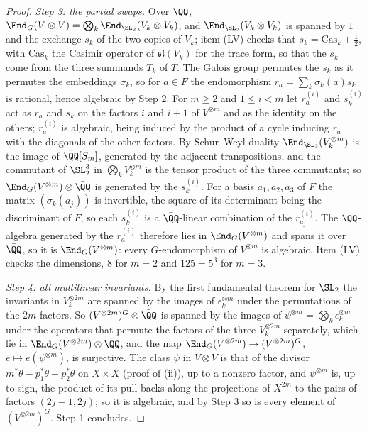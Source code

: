 \begin{proof}
\emph{Step 3: the partial swaps.} Over $\bar{\QQ}$,
$\End_{G}(V\otimes V)=\bigotimes_{k}\End_{\SL_{2}}(V_{k}\otimes V_{k})$, and
$\End_{\SL_{2}}(V_{k}\otimes V_{k})$ is spanned by $1$ and the exchange $s_{k}$
of the two copies of $V_{k}$; item (LV) checks that
$s_{k}=\mathrm{Cas}_{k}+\frac12$, with $\mathrm{Cas}_{k}$ the Casimir operator
of $\mathfrak{sl}(V_{k})$ for the trace form, so that the $s_{k}$ come from
the three summands $T_{k}$ of $T$. The Galois group permutes the $s_{k}$ as it
permutes the embeddings $\sigma_{k}$, so for $a\in F$ the endomorphism
$r_{a}=\sum_{k}\sigma_{k}(a)s_{k}$ is rational, hence algebraic by Step 2. For
$m\ge2$ and $1\le i<m$ let $r_{a}^{(i)}$ and $s_{k}^{(i)}$ act as $r_{a}$ and
$s_{k}$ on the factors $i$ and $i+1$ of $V^{\otimes m}$ and as the identity on
the others; $r_{a}^{(i)}$ is algebraic, being induced by the product of a cycle
inducing $r_{a}$ with the diagonals of the other factors. By Schur--Weyl
duality $\End_{\SL_{2}}(V_{k}^{\otimes m})$ is the image of
$\bar{\QQ}[S_{m}]$, generated by the adjacent transpositions, and the
commutant of $\SL_{2}^{3}$ in $\bigotimes_{k}V_{k}^{\otimes m}$ is the tensor
product of the three commutants; so $\End_{G}(V^{\otimes m})\otimes\bar{\QQ}$
is generated by the $s_{k}^{(i)}$. For a basis $a_{1},a_{2},a_{3}$ of $F$ the
matrix $(\sigma_{k}(a_{j}))$ is invertible, the square of its determinant being
the discriminant of $F$, so each $s_{k}^{(i)}$ is a $\bar{\QQ}$-linear
combination of the $r_{a_{j}}^{(i)}$. The $\QQ$-algebra generated by the
$r_{a}^{(i)}$ therefore lies in $\End_{G}(V^{\otimes m})$ and spans it over
$\bar{\QQ}$, so it is $\End_{G}(V^{\otimes m})$: every $G$-endomorphism of
$V^{\otimes m}$ is algebraic. Item (LV) checks the dimensions, $8$ for $m=2$
and $125=5^{3}$ for $m=3$.

\emph{Step 4: all multilinear invariants.} By the first fundamental theorem
for $\SL_{2}$ the invariants in $V_{k}^{\otimes2m}$ are spanned by the images
of $\epsilon_{k}^{\otimes m}$ under the permutations of the $2m$ factors. So
$(V^{\otimes2m})^{G}\otimes\bar{\QQ}$ is spanned by the images of
$\psi^{\otimes m}=\bigotimes_{k}\epsilon_{k}^{\otimes m}$ under the operators
that permute the factors of the three $V_{k}^{\otimes2m}$ separately, which
lie in $\End_{G}(V^{\otimes2m})\otimes\bar{\QQ}$, and the map
$\End_{G}(V^{\otimes2m})\to(V^{\otimes2m})^{G}$, $e\mapsto e(\psi^{\otimes m})$,
is surjective. The class $\psi$ in $V\otimes V$ is that of the divisor
$m^{*}\theta-p_{1}^{*}\theta-p_{2}^{*}\theta$ on $X\times X$ (proof of
(ii)), up to a nonzero factor, and $\psi^{\otimes m}$ is,
up to sign, the product of its pull-backs along the projections of $X^{2m}$
to the pairs of factors $(2j-1,2j)$; so it is algebraic, and by Step 3 so is
every element of $(V^{\otimes2m})^{G}$. Step 1 concludes.
\end{proof}

